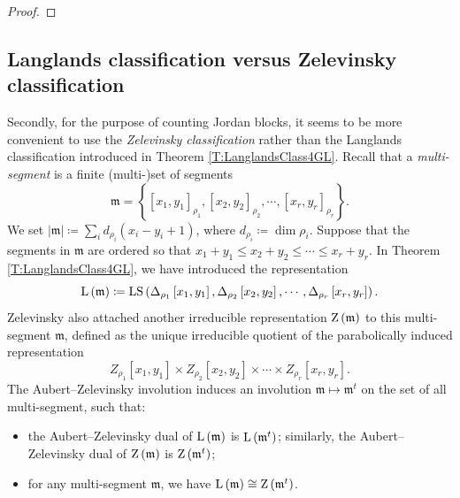 \documentclass[11pt,letterpaper]{amsart}
\theoremstyle{plain}
\numberwithin{theorem}{section}
\numberwithin{equation}{subsection}
\theoremstyle{remark}
\newcommand{\LS}{\operatorname{LS}} %
\begin{document}
\begin{proof}
\end{proof}

\vskip 5pt


\subsection{Langlands classification versus Zelevinsky classification} %
\label{sub:langlands_classification_versus_zelevinsky_classification}

Secondly, for the purpose of counting Jordan blocks, it seems to be more convenient to use the \emph{Zelevinsky classification} rather than the Langlands classification introduced in Theorem \ref{T:LanglandsClass4GL}. Recall that a \emph{multi-segment} is a finite (multi-)set of segments
\[
    \mathfrak{m} = \left\{\left[x_1,y_1\right]_{\rho_1}, \left[x_2,y_2\right]_{\rho_2}, \cdots, \left[x_r,y_r\right]_{\rho_r}\right\}.
\]
We set $|\mathfrak{m}|\coloneqq \sum_i d_{\rho_i}\left(x_i-y_i+1\right)$, where $d_{\rho_i}\coloneqq\dim\rho_i$. Suppose that the segments in $\mathfrak{m}$ are ordered so that $x_1+y_1\leq x_2+y_2\leq \cdots\leq x_r+y_r$. In Theorem \ref{T:LanglandsClass4GL}, we have introduced the representation
\[
    {\rm L}\left(\mathfrak{m}\right) \coloneqq \LS\left(\Delta_{\rho_1}\left[x_1,y_1\right], \Delta_{\rho_2}\left[x_2,y_2\right], \cdots, \Delta_{\rho_r}\left[x_r,y_r\right]\right).
\]
Zelevinsky also attached another irreducible representation ${\rm Z}\left(\mathfrak{m}\right)$ to this multi-segment $\mathfrak{m}$, defined as the unique irreducible quotient of the parabolically induced representation
\[
    Z_{\rho_1}\left[x_1,y_1\right]\times Z_{\rho_2}\left[x_2,y_2\right]\times \cdots\times Z_{\rho_r}\left[x_r,y_r\right].
\]
The Aubert--Zelevinsky involution induces an involution $\mathfrak{m}\mapsto\mathfrak{m}^t$ on the set of all multi-segment, such that:
\begin{itemize}
    \item the Aubert--Zelevinsky dual of ${\rm L}\left(\mathfrak{m}\right)$ is ${\rm L}\left(\mathfrak{m}^t\right)$; similarly, the Aubert--Zelevinsky dual of ${\rm Z}\left(\mathfrak{m}\right)$ is ${\rm Z}\left(\mathfrak{m}^t\right)$;

    \vskip 5pt

    \item for any multi-segment $\mathfrak{m}$, we have ${\rm L}\left(\mathfrak{m}\right)\cong{\rm Z}\left(\mathfrak{m}^t\right)$.
\end{itemize}
\end{document}
